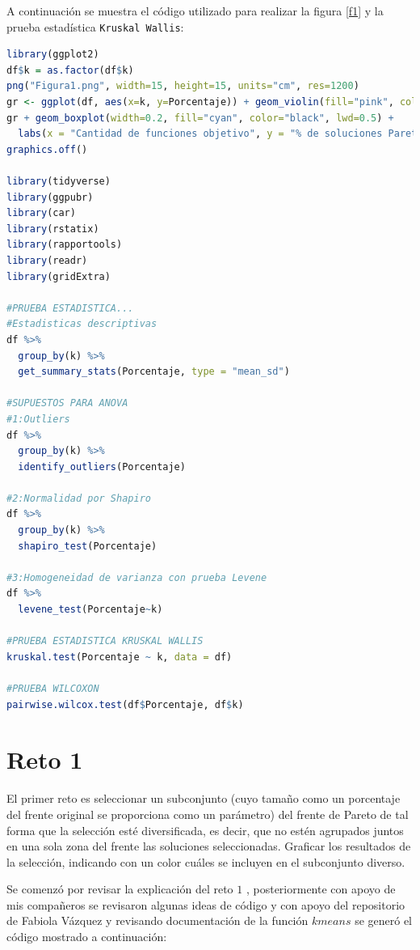 \documentclass{article}
\begin{document}
A continuación se muestra el código utilizado para realizar la figura \ref{f1} y la prueba estadística \texttt{Kruskal Wallis}:

\lstset{style=mystyle}
\begin{lstlisting}[language=R, caption= Código para graficar y realizar las pruebas estadísticas \texttt{Kruskal Wallis} y \texttt{Wilcoxon}.]
library(ggplot2)
df$k = as.factor(df$k)
png("Figura1.png", width=15, height=15, units="cm", res=1200)
gr <- ggplot(df, aes(x=k, y=Porcentaje)) + geom_violin(fill="pink", color="purple")
gr + geom_boxplot(width=0.2, fill="cyan", color="black", lwd=0.5) +
  labs(x = "Cantidad de funciones objetivo", y = "% de soluciones Pareto")
graphics.off()

library(tidyverse)
library(ggpubr)
library(car)
library(rstatix)
library(rapportools)
library(readr)
library(gridExtra)

#PRUEBA ESTADISTICA...
#Estadisticas descriptivas
df %>%
  group_by(k) %>%
  get_summary_stats(Porcentaje, type = "mean_sd")

#SUPUESTOS PARA ANOVA
#1:Outliers
df %>%
  group_by(k) %>%
  identify_outliers(Porcentaje)

#2:Normalidad por Shapiro
df %>%
  group_by(k) %>%
  shapiro_test(Porcentaje)

#3:Homogeneidad de varianza con prueba Levene
df %>%
  levene_test(Porcentaje~k)

#PRUEBA ESTADISTICA KRUSKAL WALLIS
kruskal.test(Porcentaje ~ k, data = df)

#PRUEBA WILCOXON
pairwise.wilcox.test(df$Porcentaje, df$k)
\end{lstlisting}

\newpage
\section{Reto 1}
El primer reto es seleccionar un subconjunto (cuyo tamaño como un porcentaje del frente original se proporciona como un parámetro) del frente de Pareto de tal forma que la selección esté diversificada, es decir, que no estén agrupados juntos en una sola zona del frente las soluciones seleccionadas. Graficar los resultados de la selección, indicando con un color cuáles se incluyen en el subconjunto diverso.
\bigskip

Se comenzó por revisar la explicación del reto $1$ \citep{3}, posteriormente con apoyo de mis compañeros se revisaron algunas ideas de código y con apoyo del repositorio de Fabiola Vázquez \citep{4} y revisando documentación de la función $kmeans$ \citep{5} se generó el código mostrado a continuación:
\end{document}
